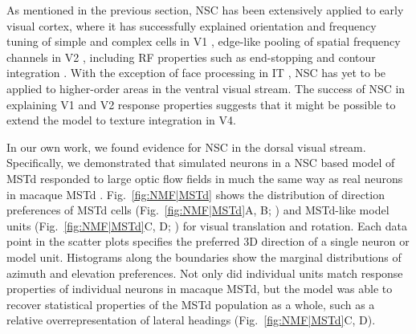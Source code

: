 As mentioned in the previous section,
\ac{NSC} has been extensively applied to early visual cortex,
where it has successfully explained 
orientation and frequency tuning of simple and complex cells in \ac{V1} \cite{Hoyer2003},
edge-like pooling of spatial frequency channels in V2 \cite{Hyvarinen2005},
including \ac{RF} properties such as end-stopping and contour integration 
\cite{HoyerHyvarinen2002}.
With the exception of face processing in \ac{IT}
\cite{LeeSeung1999,ChangTsao2017},
\ac{NSC} has yet to be applied to higher-order areas in the ventral visual stream.
The success of \ac{NSC} in explaining V1 and V2 response properties
suggests that it might be possible to extend the model to texture integration in
V4.

In our own work, we found evidence for \ac{NSC} in the dorsal visual stream.
Specifically, we demonstrated that simulated neurons 
in a \ac{NSC} based model of \ac{MSTd} 
responded to  large optic flow fields in much the same way as real neurons in macaque \ac{MSTd} \cite{Beyeler2016}.
Fig.~\ref{fig:NMF|MSTd} shows the distribution of direction preferences
of \ac{MSTd} cells (Fig.~\ref{fig:NMF|MSTd}A, B; \cite{Takahashi2007})
and \ac{MSTd}-like model units (Fig.~\ref{fig:NMF|MSTd}C, D; \cite{Beyeler2016})
for visual translation and rotation.
Each data point in the scatter plots specifies the preferred 3D direction
of a single neuron or model unit.
Histograms along the boundaries show the marginal distributions of azimuth
and elevation preferences.
Not only did individual units match response properties of individual neurons
in macaque \ac{MSTd},
but the model was able to recover statistical properties of the \ac{MSTd}
population as a whole, such as a relative overrepresentation of lateral
headings (Fig.~\ref{fig:NMF|MSTd}C, D).

